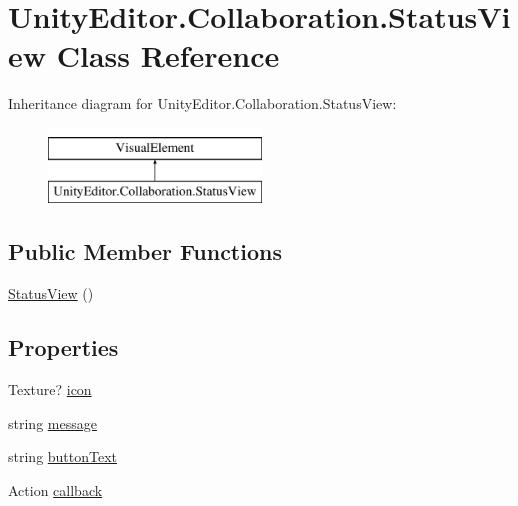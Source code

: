 \hypertarget{class_unity_editor_1_1_collaboration_1_1_status_view}{}\section{Unity\+Editor.\+Collaboration.\+Status\+View Class Reference}
\label{class_unity_editor_1_1_collaboration_1_1_status_view}
Inheritance diagram for Unity\+Editor.\+Collaboration.\+Status\+View\+:\begin{figure}[H]
\begin{center}
\leavevmode
\includegraphics[height=2.000000cm]{class_unity_editor_1_1_collaboration_1_1_status_view}
\end{center}
\end{figure}
\subsection*{Public Member Functions}
\begin{DoxyCompactItemize}
\item 
\mbox{\hyperlink{class_unity_editor_1_1_collaboration_1_1_status_view_ab23b41293a8eac1f27896392175d739e}{Status\+View}} ()
\end{DoxyCompactItemize}
\subsection*{Properties}
\begin{DoxyCompactItemize}
\item 
Texture? \mbox{\hyperlink{class_unity_editor_1_1_collaboration_1_1_status_view_ab7eb6e777bbbae69232c83afae81d460}{icon}}
\item 
string \mbox{\hyperlink{class_unity_editor_1_1_collaboration_1_1_status_view_aa093dcc5f90d1de91689412c8755bdcf}{message}}
\item 
string \mbox{\hyperlink{class_unity_editor_1_1_collaboration_1_1_status_view_a15a6f446a5e787bec5911323506958a8}{button\+Text}}
\item 
Action \mbox{\hyperlink{class_unity_editor_1_1_collaboration_1_1_status_view_a6b04e602c1792d731fe2bfd32be8b7bb}{callback}}
\end{DoxyCompactItemize}


